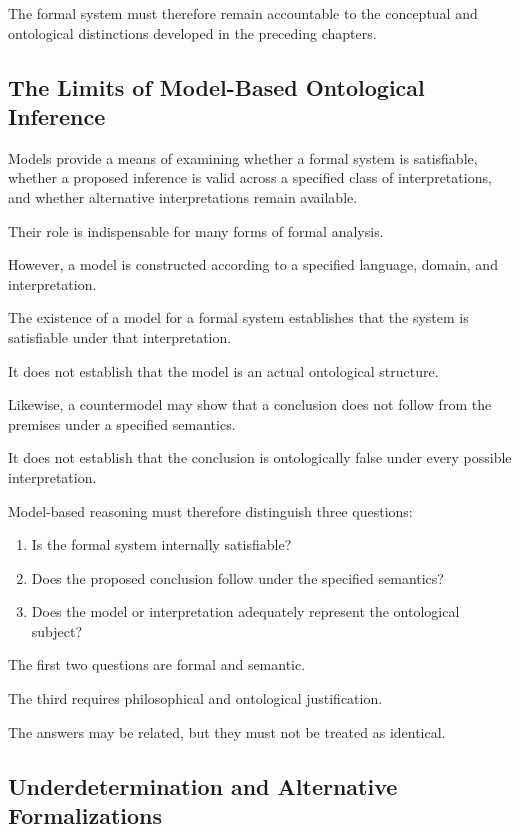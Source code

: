 The formal
system must
therefore remain
accountable to
the conceptual
and ontological
distinctions developed
in the preceding
chapters.

\subsection{The Limits of Model-Based Ontological Inference}

Models provide
a means of
examining whether
a formal
system is
satisfiable, whether
a proposed
inference is
valid across
a specified
class of
interpretations, and
whether alternative
interpretations remain
available.

Their role
is indispensable
for many
forms of
formal analysis.

However, a
model is
constructed according
to a
specified language,
domain, and
interpretation.

The existence
of a model
for a
formal system
establishes that
the system
is satisfiable
under that
interpretation.

It does
not establish
that the
model is
an actual
ontological structure.

Likewise, a
countermodel may
show that
a conclusion
does not
follow from
the premises
under a
specified semantics.

It does
not establish
that the
conclusion is
ontologically false
under every
possible interpretation.

Model-based
reasoning must
therefore distinguish
three questions:

\begin{enumerate}
    \item Is the
    formal system
    internally
    satisfiable?
    \item Does the
    proposed conclusion
    follow under
    the specified
    semantics?
    \item Does the
    model or
    interpretation
    adequately represent
    the ontological
    subject?
\end{enumerate}

The first
two questions
are formal
and semantic.

The third
requires philosophical
and ontological
justification.

The answers
may be related,
but they
must not
be treated
as identical.

\subsection{Underdetermination and Alternative Formalizations}

